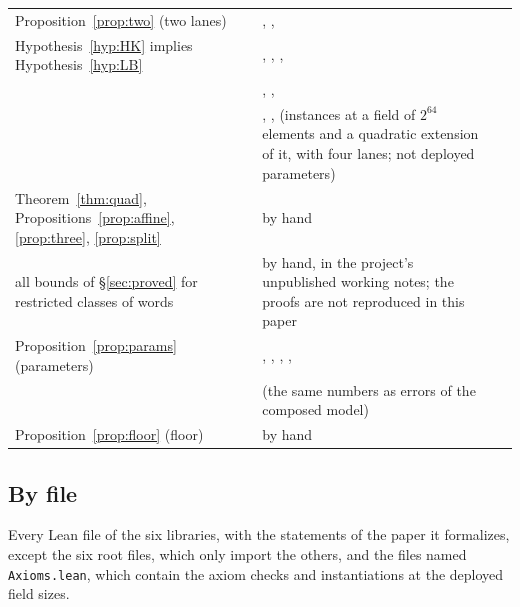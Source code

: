 {\begin{longtable}{@{}L{0.25\textwidth}L{0.42\textwidth}L{0.27\textwidth}@{}}
Proposition~\ref{prop:two} (two lanes) & , ,  & \\
Hypothesis~\ref{hyp:HK} implies Hypothesis~\ref{hyp:LB} & , , ,  & \\
 & , ,  & \\
 & , ,  (instances at a field of $2^{64}$ elements and a quadratic extension of it, with four lanes; not deployed parameters) & \\
\addlinespace
Theorem~\ref{thm:quad}, Propositions~\ref{prop:affine}, \ref{prop:three}, \ref{prop:split} & by hand & \\
all bounds of \S\ref{sec:proved} for restricted classes of words & by hand, in the project's unpublished working notes; the proofs are not reproduced in this paper & \\
\addlinespace
Proposition~\ref{prop:params} (parameters) & , , , ,  & \\
 &  (the same numbers as errors of the composed model) & \\
Proposition~\ref{prop:floor} (floor) & by hand & \\
\bottomrule
\end{longtable}}

\subsection*{By file}

Every Lean file of the six libraries, with the statements of the paper it formalizes, except the six root files, which only import the others, and the files named \texttt{Axioms.lean}, which contain the axiom checks and instantiations at the deployed field sizes.

